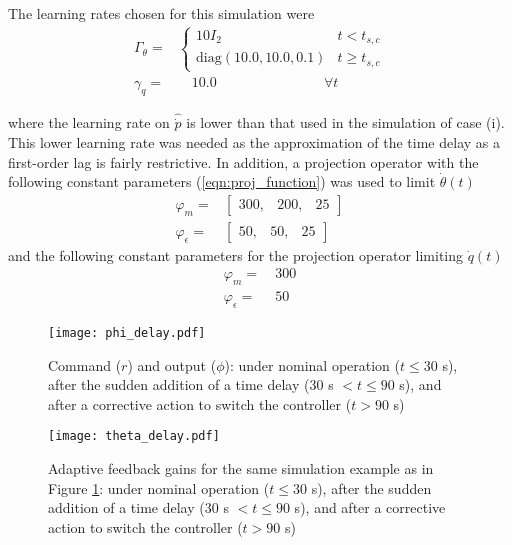 \noindent The learning rates chosen for this simulation were
\begin{align}
	\Gamma_\theta  = & \begin{cases}
		10 I_2 & t < t_{s,c}\\
		\text{diag}(10.0, 10.0, 0.1) & t \geq t_{s,c}
 	\end{cases} \\
	\gamma_q  = &\quad 10.0 \qquad ~ \qquad ~ \qquad ~ \quad \forall t
\end{align}

\noindent where the learning rate on $\hat{\dot{p}}$ is lower than that used in the simulation of case (i). This lower learning rate was needed as the approximation of the time delay as a first-order lag is fairly restrictive. In addition, a projection operator with the following constant parameters (\ref{eqn:proj_function}) was used to limit $\dot{\theta}(t)$
\begin{align}
	\varphi_m = & \begin{bmatrix}
		300, & 200, & 25
	\end{bmatrix} \\
	\varphi_{\epsilon} = & \begin{bmatrix}
		50, & 50, & 25
	\end{bmatrix}\end{align}
\noindent and the following constant parameters for the projection operator limiting $\dot{q}(t)$
\begin{align}
	\varphi_m = &~ 300\\
	\varphi_{\epsilon} = &~ 50
\end{align}

\begin{figure}[h!]
	\centering
	\texttt{[image: phi\_delay.pdf]}
	\caption{Command ($r$) and output ($\phi$): under nominal operation ($t \leq 30$ s), after the sudden addition of a time delay ($30$ s $< t \leq 90$ s), and after a corrective action to switch the controller ($t > 90$ s)}
	\label{fig:command_and_output_d}
\end{figure}

\begin{figure}[h!]
	\centering
	\texttt{[image: theta\_delay.pdf]}
	\caption{Adaptive feedback gains for the same simulation example as in Figure \ref{fig:command_and_output_d}: under nominal operation ($t \leq 30$ s), after the sudden addition of a time delay ($30$ s $< t \leq 90$ s), and after a corrective action to switch the controller ($t > 90$ s)}
	\label{fig:theta_d}
\end{figure}

